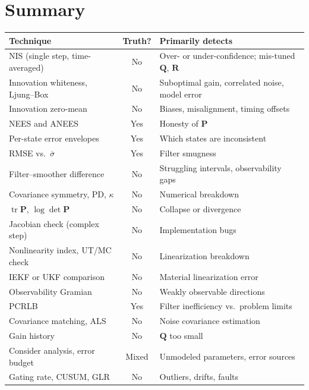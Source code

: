 \documentclass[11pt]{article}
\newcommand{\Pm}{\bm{P}}
\newcommand{\Qm}{\bm{Q}}
\newcommand{\Rm}{\bm{R}}
\begin{document}
\section{Summary}
\begin{center}
\small
\begin{tabularx}{\textwidth}{@{}lcX@{}}
\toprule
\textbf{Technique} & \textbf{Truth?} & \textbf{Primarily detects} \\
\midrule
NIS (single step, time-averaged) & No  & Over- or under-confidence; mis-tuned $\Qm$, $\Rm$ \\
Innovation whiteness, Ljung--Box & No  & Suboptimal gain, correlated noise, model error \\
Innovation zero-mean             & No  & Biases, misalignment, timing offsets \\
NEES and ANEES                   & Yes & Honesty of $\Pm$ \\
Per-state error envelopes        & Yes & Which states are inconsistent \\
RMSE vs.\ $\overline{\sigma}$    & Yes & Filter smugness \\
Filter--smoother difference      & No  & Struggling intervals, observability gaps \\
Covariance symmetry, PD, $\kappa$& No  & Numerical breakdown \\
$\operatorname{tr}\Pm$, $\log\det\Pm$ & No & Collapse or divergence \\
Jacobian check (complex step)    & No  & Implementation bugs \\
Nonlinearity index, UT/MC check  & No  & Linearization breakdown \\
IEKF or UKF comparison           & No  & Material linearization error \\
Observability Gramian            & No  & Weakly observable directions \\
PCRLB                            & Yes & Filter inefficiency vs.\ problem limits \\
Covariance matching, ALS         & No  & Noise covariance estimation \\
Gain history                     & No  & $\Qm$ too small \\
Consider analysis, error budget  & Mixed & Unmodeled parameters, error sources \\
Gating rate, CUSUM, GLR          & No  & Outliers, drifts, faults \\
\bottomrule
\end{tabularx}
\end{center}

\nocite{*}
\printbibliography
\end{document}
